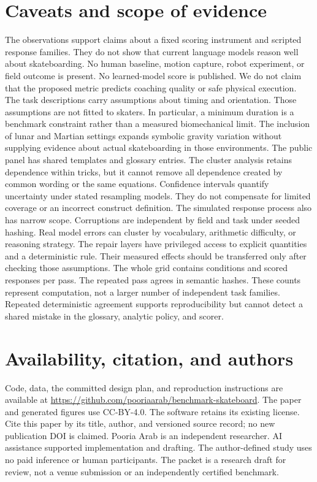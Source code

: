 \documentclass{article}
\begin{document}
\section{Caveats and scope of evidence}
The observations support claims about a fixed scoring instrument and scripted response families. They do not show that current language models reason well about skateboarding. No human baseline, motion capture, robot experiment, or field outcome is present. No learned-model score is published. We do not claim that the proposed metric predicts coaching quality or safe physical execution.
The task descriptions carry assumptions about timing and orientation. Those assumptions are not fitted to skaters. In particular, a minimum duration is a benchmark constraint rather than a measured biomechanical limit. The inclusion of lunar and Martian settings expands symbolic gravity variation without supplying evidence about actual skateboarding in those environments.
The public panel has shared templates and glossary entries. The cluster analysis retains dependence within tricks, but it cannot remove all dependence created by common wording or the same equations. Confidence intervals quantify uncertainty under stated resampling models. They do not compensate for limited coverage or an incorrect construct definition.
The simulated response process also has narrow scope. Corruptions are independent by field and task under seeded hashing. Real model errors can cluster by vocabulary, arithmetic difficulty, or reasoning strategy. The repair layers have privileged access to explicit quantities and a deterministic rule. Their measured effects should be transferred only after checking those assumptions.
The whole grid contains \ConditionCount{} conditions and \ObservationCount{} scored responses per pass. The repeated pass agrees in semantic hashes. These counts represent computation, not a larger number of independent task families. Repeated deterministic agreement supports reproducibility but cannot detect a shared mistake in the glossary, analytic policy, and scorer.
\section{Availability, citation, and authors}
Code, data, the committed design plan, and reproduction instructions are available at \url{https://github.com/pooriaarab/benchmark-skateboard}. The paper and generated figures use CC-BY-4.0. The software retains its existing license. Cite this paper by its title, author, and versioned source record; no new publication DOI is claimed.
Pooria Arab is an independent researcher. AI assistance supported implementation and drafting. The author-defined study uses no paid inference or human participants. The packet is a research draft for review, not a venue submission or an independently certified benchmark.


\end{document}
